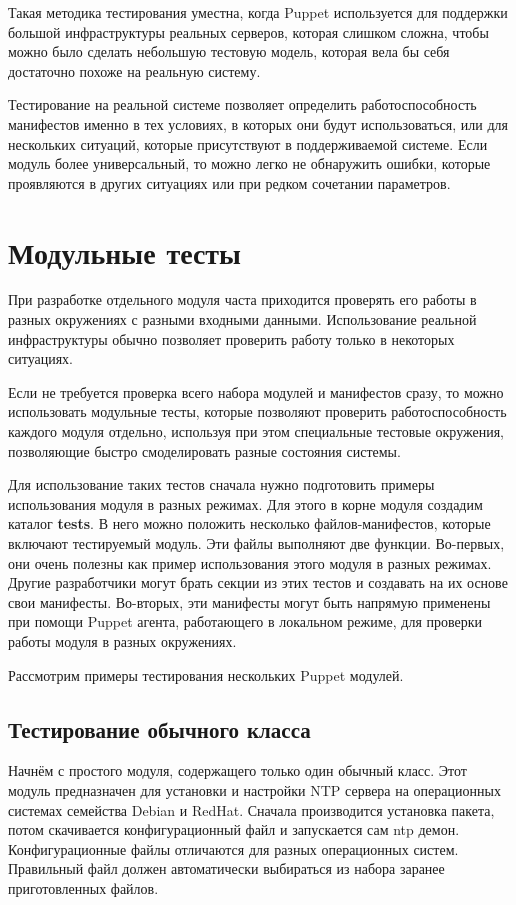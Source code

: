 Такая методика тестирования уместна, когда Puppet используется для поддержки большой инфраструктуры реальных серверов, которая слишком сложна, чтобы можно было сделать небольшую тестовую модель, которая вела бы себя достаточно похоже на реальную систему.

Тестирование на реальной системе позволяет определить работоспособность манифестов именно в тех условиях, в которых они будут использоваться, или для нескольких ситуаций, которые присутствуют в поддерживаемой системе. Если модуль более универсальный, то можно легко не обнаружить ошибки, которые проявляются в других ситуациях или при редком сочетании параметров.

\section{Модульные тесты}

При разработке отдельного модуля часта приходится проверять его работы в разных окружениях с разными входными данными. Использование реальной инфраструктуры обычно позволяет проверить работу только в некоторых ситуациях.

Если не требуется проверка всего набора модулей и манифестов сразу, то можно использовать модульные тесты, которые позволяют проверить работоспособность каждого модуля отдельно, используя при этом специальные тестовые окружения, позволяющие быстро смоделировать разные состояния системы.

Для использование таких тестов сначала нужно подготовить примеры использования модуля в разных режимах. Для этого в корне модуля создадим каталог \textbf{tests}. В него можно положить несколько файлов-манифестов, которые включают тестируемый модуль. Эти файлы выполняют две функции. Во-первых, они очень полезны как пример использования этого модуля в разных режимах. Другие разработчики могут брать секции из этих тестов и создавать на их основе свои манифесты. Во-вторых, эти манифесты могут быть напрямую применены при помощи Puppet агента, работающего в локальном режиме, для проверки работы модуля в разных окружениях.

Рассмотрим примеры тестирования нескольких Puppet модулей.

\subsection{Тестирование обычного класса}

Начнём с простого модуля, содержащего только один обычный класс. Этот модуль предназначен для установки и настройки NTP сервера на операционных системах семейства Debian и RedHat. Сначала производится установка пакета, потом скачивается конфигурационный файл и запускается сам ntp демон. Конфигурационные файлы отличаются для разных операционных систем. Правильный файл должен автоматически выбираться из набора заранее приготовленных файлов.

